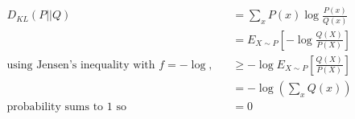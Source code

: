 %
%
\begin{answer}
\begin{align*}
D_{KL}(P || Q)
&= \sum_{x} P(x) \log \frac{P(x)}{Q(x)}\\
&= E_{X \sim P} \left [ -\log \frac{Q(X)}{P(X)} \right ] \\
\text{using Jensen's inequality with $f = -\log$,} \quad
&\geq - \log E_{X \sim P} \left [ \frac{Q(X)}{P(X)} \right ]\\
&= - \log \left( \sum_x Q(x) \right)\\
\text{probability sums to 1 so} \quad &= 0
\end{align*}
\end{answer}
%
